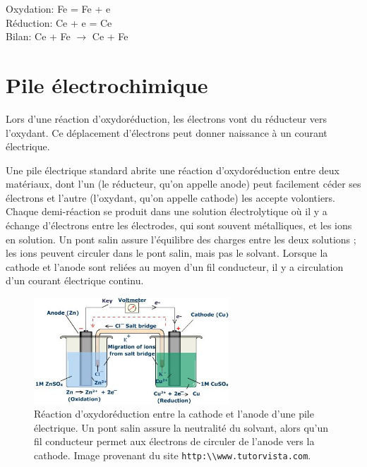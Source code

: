 \documentclass[12pt,oneside,letterpaper]{article}
\begin{document}
\begin{center}
Oxydation: Fe = Fe + e\up{--}\\
Réduction: Ce + e\up{--} = Ce\\
Bilan: Ce + Fe $\rightarrow$ Ce + Fe
\end{center}


\section{Pile électrochimique}

Lors d'une réaction d'oxydoréduction, les électrons vont du réducteur vers l'oxydant. Ce déplacement d'électrons peut donner naissance à un courant électrique.

Une pile électrique standard abrite une réaction d'oxydoréduction entre deux matériaux, dont l'un (le réducteur, qu'on appelle anode) peut facilement céder ses électrons et l'autre (l'oxydant, qu'on appelle cathode) les accepte volontiers. Chaque demi-réaction se produit dans une solution électrolytique où il y a échange d'électrons entre les électrodes, qui sont souvent métalliques, et les ions en solution. Un pont salin assure l'équilibre des charges entre les deux solutions ; les ions peuvent circuler dans le pont salin, mais pas le solvant. Lorsque la cathode et l'anode sont reliées au moyen d'un fil conducteur, il y a circulation d'un courant électrique continu.

\begin{figure}[h]
\begin{center}
\includegraphics[width=0.65\textwidth]{L01_ElectricCell.jpeg}
\caption{\label{Pauling}Réaction d'oxydoréduction entre la cathode et l'anode d'une pile électrique. Un pont salin assure la neutralité du solvant, alors qu'un fil conducteur permet aux électrons de circuler de l'anode vers la cathode. Image provenant du site \texttt{http:\textbackslash\textbackslash www.tutorvista.com}.}
\end{center}
\end{figure}
\end{document}
